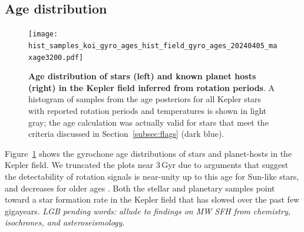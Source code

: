 \documentclass[11pt,twocolumn,tighten]{aastex63}
\begin{document}
\subsection{Age distribution}

\begin{figure}[!t]
	\begin{center}
		\leavevmode
		\texttt{[image: hist\_samples\_koi\_gyro\_ages\_hist\_field\_gyro\_ages\_20240405\_maxage3200.pdf]}
	\end{center}
	\vspace{-0.6cm}
	\caption{
    {\bf Age distribution of stars (left) and known planet hosts
    (right) in the Kepler field inferred from rotation periods}.
    A histogram of samples from the age posteriors for all Kepler
    stars with reported rotation periods and temperatures is shown in
    light gray;
    the age calculation was actually valid for stars that meet the criteria
    discussed in Section~\ref{subsec:flags} (dark blue).
		\label{fig:hist_tgyro}
	}
\end{figure}

Figure~\ref{fig:hist_tgyro} shows the gyrochone age distributions of
stars and planet-hosts in the Kepler field.
We truncated the plots near $3$\,Gyr due to arguments that suggest the
detectability of rotation signals is near-unity up to this age for
Sun-like stars, and decreases for older ages
\citep{2022ApJ...937...94M}.
Both the stellar and planetary samples point toward a star formation
rate in the Kepler field that has slowed over the past few gigayears.
{\it LGB pending words: allude to findings on MW SFH from chemistry,
isochrones, and asteroseismology}.

%
\end{document}
